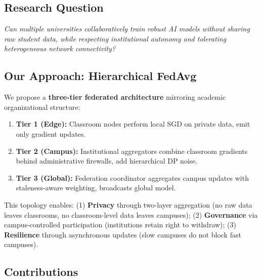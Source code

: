 \documentclass[conference]{IEEEtran}
\begin{document}
\subsection{Research Question}

\textit{Can multiple universities collaboratively train robust AI models without sharing raw student data, while respecting institutional autonomy and tolerating heterogeneous network connectivity?}

\subsection{Our Approach: Hierarchical FedAvg}

We propose a \textbf{three-tier federated architecture} mirroring academic organizational structure:

\begin{enumerate}
    \item \textbf{Tier 1 (Edge):} Classroom nodes perform local SGD on private data, emit only gradient updates.
    \item \textbf{Tier 2 (Campus):} Institutional aggregators combine classroom gradients behind administrative firewalls, add hierarchical DP noise.
    \item \textbf{Tier 3 (Global):} Federation coordinator aggregates campus updates with staleness-aware weighting, broadcasts global model.
\end{enumerate}

This topology enables: (1) \textbf{Privacy} through two-layer aggregation (no raw data leaves classrooms, no classroom-level data leaves campuses); (2) \textbf{Governance} via campus-controlled participation (institutions retain right to withdraw); (3) \textbf{Resilience} through asynchronous updates (slow campuses do not block fast campuses).

\subsection{Contributions}
\end{document}
